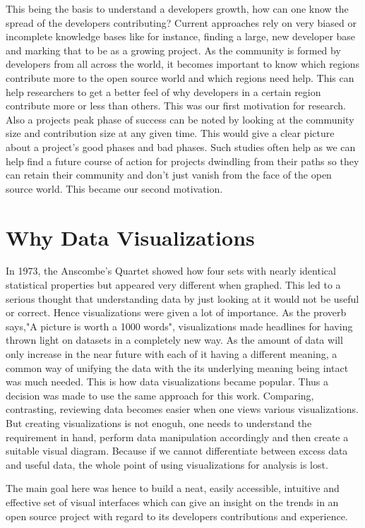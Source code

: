 \documentclass[seploa]{beavtex}
\begin{document}
This being the basis to understand a developers growth, how can one know the spread of the developers contributing? Current approaches rely on very biased or incomplete knowledge bases like for instance, finding a large, new developer base and marking that to be as a growing project\cite{igor2014}. As the community is formed by developers from all across the world, it becomes important to know which regions contribute more to the open source world and which regions need help. This can help researchers to get a better feel of why developers in a certain region contribute more or less than others. This was our first motivation for research. Also a projects peak phase of success can be noted by looking at the community size and contribution size at any given time. This would give a clear picture about a project's good phases and bad phases. Such studies often help as we can help find a future course of action for projects dwindling from their paths so they can retain their community and don't just vanish from the face of the open source world. This became our second motivation.

\section{Why Data Visualizations}
In 1973, the Anscombe's Quartet showed how four sets with nearly identical statistical properties but appeared very different when graphed\cite{wiki}. This led to a serious thought that understanding data by just looking at it would not be useful or correct. Hence visualizations were given a lot of importance. As the proverb says,"A picture is worth a 1000 words", visualizations made headlines for having thrown light on datasets in a completely new way. As the amount of data will only increase in the near future with each of it having a different meaning, a common way of unifying the data with the its underlying meaning being intact was much needed. This is how data visualizations became popular. Thus a decision was made to use the same approach for this work. Comparing, contrasting, reviewing data becomes easier when one views various visualizations. But creating visualizations is not enoguh, one needs to understand the requirement in hand, perform data manipulation accordingly and then create a suitable visual diagram. Because if we cannot differentiate between excess data and useful data, the whole point of using visualizations for analysis is lost. 

The main goal here was hence to build a neat, easily accessible, intuitive and effective set of visual interfaces which can give an insight on the trends in an open source project with regard to its developers contributions and experience.
\end{document}
